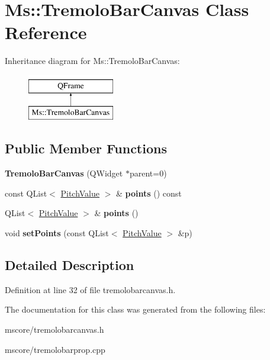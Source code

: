 \hypertarget{class_ms_1_1_tremolo_bar_canvas}{}\section{Ms\+:\+:Tremolo\+Bar\+Canvas Class Reference}
\label{class_ms_1_1_tremolo_bar_canvas}
Inheritance diagram for Ms\+:\+:Tremolo\+Bar\+Canvas\+:\begin{figure}[H]
\begin{center}
\leavevmode
\includegraphics[height=2.000000cm]{class_ms_1_1_tremolo_bar_canvas}
\end{center}
\end{figure}
\subsection*{Public Member Functions}
\begin{DoxyCompactItemize}
\item 
\mbox{\label{class_ms_1_1_tremolo_bar_canvas_ad83aac25042eab310349de0e7ace9a6e}} 
{\bfseries Tremolo\+Bar\+Canvas} (Q\+Widget $\ast$parent=0)
\item 
\mbox{\label{class_ms_1_1_tremolo_bar_canvas_afaf13a0828f40b982f74dbfc8bedceb6}} 
const Q\+List$<$ \hyperlink{struct_ms_1_1_pitch_value}{Pitch\+Value} $>$ \& {\bfseries points} () const
\item 
\mbox{\label{class_ms_1_1_tremolo_bar_canvas_ab623a2e24d5a0b2c564c7a2e99142063}} 
Q\+List$<$ \hyperlink{struct_ms_1_1_pitch_value}{Pitch\+Value} $>$ \& {\bfseries points} ()
\item 
\mbox{\label{class_ms_1_1_tremolo_bar_canvas_a7c1934b2d91a69a13e6cccbe0dd8594b}} 
void {\bfseries set\+Points} (const Q\+List$<$ \hyperlink{struct_ms_1_1_pitch_value}{Pitch\+Value} $>$ \&p)
\end{DoxyCompactItemize}


\subsection{Detailed Description}


Definition at line 32 of file tremolobarcanvas.\+h.



The documentation for this class was generated from the following files\+:\begin{DoxyCompactItemize}
\item 
mscore/tremolobarcanvas.\+h\item 
mscore/tremolobarprop.\+cpp\end{DoxyCompactItemize}
